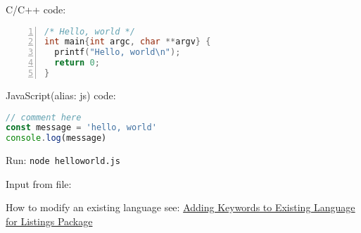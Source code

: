 \documentclass{article}
\begin{document}
C/C++ code:

\begin{lstlisting}[language=C,caption={C/C++ language},numbers=left]
/* Hello, world */
int main{int argc, char **argv} {
  printf("Hello, world\n");
  return 0;
}
\end{lstlisting}


JavaScript(alias: js) code:

\begin{lstlisting}[language=js,caption={JavaScript language}]
// comment here
const message = 'hello, world'
console.log(message)
\end{lstlisting}

Run: \lstinline!node helloworld.js!


Input from file:



How to modify an existing language
see:
\href{https://tex.stackexchange.com/questions/224093/adding-keywords-to-existing-language-for-listings-package}{Adding Keywords to Existing Language for Listings Package}
\end{document}
